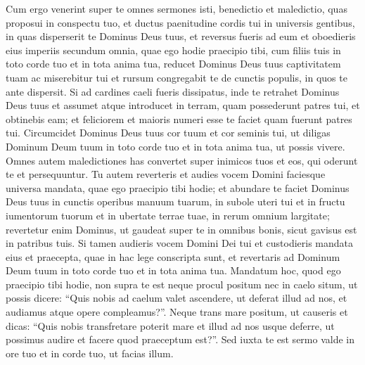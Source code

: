 \begin{biblechapter}
\begin{biblechapter}
\begin{biblechapter}
\begin{biblechapter}
\begin{biblechapter}
\begin{biblechapter}
\begin{biblechapter}
\begin{biblechapter}
\begin{biblechapter}
\begin{biblechapter}
\begin{biblechapter}
\begin{biblechapter}
\begin{biblechapter}
\begin{biblechapter}
\begin{biblechapter}
\begin{biblechapter}
\begin{biblechapter}
\begin{biblechapter}
\begin{biblechapter}
\begin{biblechapter}
\begin{biblechapter}
\begin{biblechapter}
\begin{biblechapter}
\begin{biblechapter}
\begin{biblechapter}
\begin{biblechapter}
\begin{biblechapter}
\begin{biblechapter}
\begin{biblechapter}
\begin{biblechapter}
\verse Cum ergo venerint super te omnes sermones isti, benedictio et maledictio, quas proposui in conspectu tuo, et ductus paenitudine cordis tui in universis gentibus, in quas disperserit te Dominus Deus tuus, 
\verse et reversus fueris ad eum et oboedieris eius imperiis secundum omnia, quae ego hodie praecipio tibi, cum filiis tuis in toto corde tuo et in tota anima tua, 
\verse reducet Dominus Deus tuus captivitatem tuam ac miserebitur tui et rursum congregabit te de cunctis populis, in quos te ante dispersit. 
\verse Si ad cardines caeli fueris dissipatus, inde te retrahet Dominus Deus tuus et assumet 
\verse atque introducet in terram, quam possederunt patres tui, et obtinebis eam; et feliciorem et maioris numeri esse te faciet quam fuerunt patres tui.
 \verse Circumcidet Dominus Deus tuus cor tuum et cor seminis tui, ut diligas Dominum Deum tuum in toto corde tuo et in tota anima tua, ut possis vivere. 
\verse Omnes autem maledictiones has convertet super inimicos tuos et eos, qui oderunt te et persequuntur. 
\verse Tu autem reverteris et audies vocem Domini faciesque universa mandata, quae ego praecipio tibi hodie; 
\verse et abundare te faciet Dominus Deus tuus in cunctis operibus manuum tuarum, in subole uteri tui et in fructu iumentorum tuorum et in ubertate terrae tuae, in rerum omnium largitate; revertetur enim Dominus, ut gaudeat super te in omnibus bonis, sicut gavisus est in patribus tuis. 
\verse Si tamen audieris vocem Domini Dei tui et custodieris mandata eius et praecepta, quae in hac lege conscripta sunt, et revertaris ad Dominum Deum tuum in toto corde tuo et in tota anima tua.
 \verse Mandatum hoc, quod ego praecipio tibi hodie, non supra te est neque procul positum 
\verse nec in caelo situm, ut possis dicere: “Quis nobis ad caelum valet ascendere, ut deferat illud ad nos, et audiamus atque opere compleamus?”. 
\verse Neque trans mare positum, ut causeris et dicas: “Quis nobis transfretare poterit mare et illud ad nos usque deferre, ut possimus audire et facere quod praeceptum est?”. 
\verse Sed iuxta te est sermo valde in ore tuo et in corde tuo, ut facias illum.

\end{biblechapter}
\end{biblechapter}
\end{biblechapter}
\end{biblechapter}
\end{biblechapter}
\end{biblechapter}
\end{biblechapter}
\end{biblechapter}
\end{biblechapter}
\end{biblechapter}
\end{biblechapter}
\end{biblechapter}
\end{biblechapter}
\end{biblechapter}
\end{biblechapter}
\end{biblechapter}
\end{biblechapter}
\end{biblechapter}
\end{biblechapter}
\end{biblechapter}
\end{biblechapter}
\end{biblechapter}
\end{biblechapter}
\end{biblechapter}
\end{biblechapter}
\end{biblechapter}
\end{biblechapter}
\end{biblechapter}
\end{biblechapter}
\end{biblechapter}
